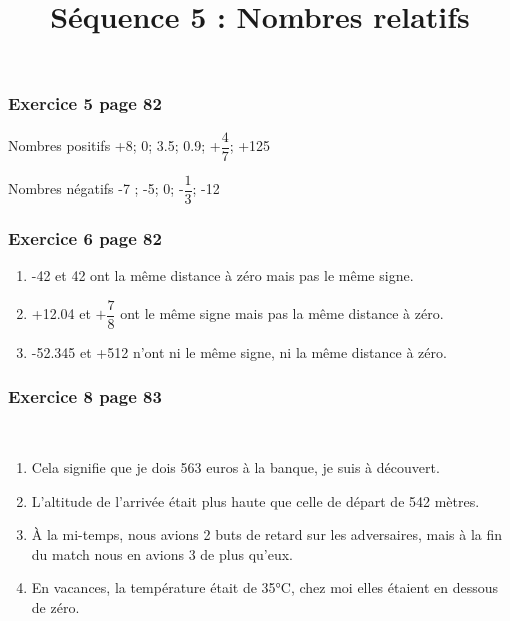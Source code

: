 \documentclass[xcolor={dvipsnames}, handout]{beamer}
\title{Séquence 5 : Nombres relatifs}
\begin{document}


	

\begin{frame}
	\frametitle{Exercice 5 page 82}
	
	\begin{block}{Nombres positifs}
		+8; 0; \num{+3.5}; \num{+0.9}; +$\dfrac{4}{7}$; +125
	\end{block}

	\begin{block}{Nombres négatifs}
		-7 ; -5; 0; -$\dfrac{1}{3}$; -12
	\end{block}
	
	
\end{frame}



\begin{frame}
	\frametitle{Exercice 6 page 82}
	
	\begin{enumerate}
		\item -42 et 42 ont la même distance à zéro mais pas le même signe. \pause
		\item +\num{12.04} et $+\dfrac{7}{8}$ ont le même signe mais pas la même distance à zéro.\pause
		\item -\num{52.345} et +512 n'ont ni le même signe, ni la même distance à zéro.
	\end{enumerate}	
	
\end{frame}

\begin{frame}
	\frametitle{Exercice 8 page 83}
	\ \pause
	\begin{enumerate}
		\item Cela signifie que je dois 563 euros à la banque, je suis à découvert.\pause
		\item L'altitude de l'arrivée était plus haute que celle de départ de 542 mètres.\pause
		\item \`A la mi-temps, nous avions 2 buts de retard sur les adversaires, mais à la fin du match nous en avions 3 de plus qu'eux.\pause
		\item En vacances, la température était de 35°C, chez moi elles étaient en dessous de zéro.
	\end{enumerate}
\end{frame}
\end{document}
